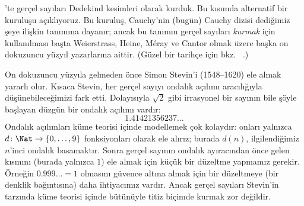 \documentclass[../../../include/open-logic-section]{subfiles}
\begin{document}


'te gerçel sayıları Dedekind kesimleri olarak kurduk. Bu
kısımda alternatif bir kuruluşu açıklıyoruz. Bu kuruluş, Cauchy'nin (bugün)
Cauchy dizisi dediğimiz şeye ilişkin tanımına dayanır; ancak bu tanımın gerçel
sayıları \emph{kurmak} için kullanılması başta Weierstrass, Heine, M\'{e}ray
ve Cantor olmak üzere başka on dokuzuncu yüzyıl yazarlarına aittir. (Güzel
bir tarihçe için bkz.\ \citeauthor{OConnorRobertson:RN}
\citeyear{OConnorRobertson:RN}.)

On dokuzuncu yüzyıla gelmeden önce Simon Stevin'i (1548--1620) ele almak
yararlı olur. Kısaca Stevin, her gerçel sayıyı ondalık açılımı aracılığıyla
düşünebileceğimizi fark etti. Dolayısıyla $\sqrt{2}$ gibi irrasyonel bir
sayının bile şöyle başlayan düzgün bir ondalık açılımı vardır:
\[
	1.41421356237\ldots
\]
Ondalık açılımları küme teorisi içinde modellemek çok kolaydır: onları
yalnızca $d \colon \Nat \to \{0,\ldots,9\}$ fonksiyonları olarak ele alırız; burada
$d(n)$, ilgilendiğimiz $n$'inci ondalık basamaktır. Sonra gerçel sayının ondalık
ayıracından önce gelen kısmını (burada yalnızca $1$) ele almak için küçük bir
düzeltme yapmamız gerekir. Örneğin $0.999\ldots = 1$ olmasını güvence altına
almak için bir düzeltmeye (bir denklik bağıntısına) daha ihtiyacımız vardır.
Ancak gerçel sayıları Stevin'in tarzında küme teorisi içinde bütünüyle titiz
biçimde kurmak zor değildir.
\end{document}

